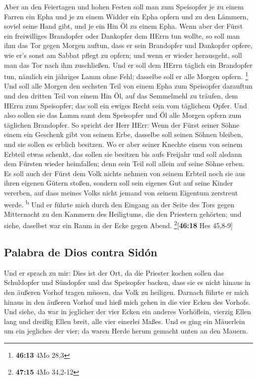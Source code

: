 Aber an den Feiertagen und hohen Festen soll man zum
Speisopfer je zu einem Farren ein Epha und je zu einem Widder ein Epha
opfern und zu den Lämmern, soviel seine Hand gibt, und je ein Hin Öl zu
einem Epha.  Wenn aber der Fürst ein freiwilliges
Brandopfer oder Dankopfer dem HErrn tun wollte, so soll man ihm das Tor
gegen Morgen auftun, dass er sein Brandopfer und Dankopfer opfere, wie
er's sonst am Sabbat pflegt zu opfern; und wenn er wieder herausgeht,
soll man das Tor nach ihm zuschließen.  Und er soll dem
HErrn täglich ein Brandopfer tun, nämlich ein jähriges Lamm ohne Fehl;
dasselbe soll er alle Morgen opfern. \footnote{\textbf{46:13} 4Mo 28,3}
 Und soll alle Morgen den sechsten Teil von einem Epha
zum Speisopfer darauftun und den dritten Teil von einem Hin Öl, auf das
Semmelmehl zu träufen, dem HErrn zum Speisopfer; das soll ein ewiges
Recht sein vom täglichem Opfer.  Und also sollen sie das
Lamm samt dem Speisopfer und Öl alle Morgen opfern zum täglichen
Brandopfer.  So spricht der Herr HErr: Wenn der Fürst
seiner Söhne einem ein Geschenk gibt von seinem Erbe, dasselbe soll
seinen Söhnen bleiben, und sie sollen es erblich besitzen.
 Wo er aber seiner Knechte einem von seinem Erbteil etwas
schenkt, das sollen sie besitzen bis aufs Freijahr und soll alsdann dem
Fürsten wieder heimfallen; denn sein Teil soll allein auf seine Söhne
erben.  Es soll auch der Fürst dem Volk nichts nehmen von
seinem Erbteil noch sie aus ihren eigenen Gütern stoßen, sondern soll
sein eigenes Gut auf seine Kinder vererben, auf dass meines Volks nicht
jemand von seinem Eigentum zerstreut werde. \textsuperscript{b}
 Und er führte mich durch den Eingang an der Seite des
Tors gegen Mitternacht zu den Kammern des Heiligtums, die den Priestern
gehörten; und siehe, daselbst war ein Raum in der Ecke gegen Abend.
\footnote{\textbf{47:15} 4Mo 34,2-12}{[}\textbf{46:18} Hes 45,8-9{]}

\hypertarget{palabra-de-dios-contra-siduxf3n}{%
\subsection{Palabra de Dios contra
Sidón}\label{palabra-de-dios-contra-siduxf3n}}

 Und er sprach zu mir: Dies ist der Ort, da die Priester
kochen sollen das Schuldopfer und Sündopfer und das Speisopfer backen,
dass sie es nicht hinaus in den äußeren Vorhof tragen müssen, das Volk
zu heiligen.  Darnach führte er mich hinaus in den
äußeren Vorhof und hieß mich gehen in die vier Ecken des Vorhofs.
 Und siehe, da war in jeglicher der vier Ecken ein
anderes Vorhöflein, vierzig Ellen lang und dreißig Ellen breit, alle
vier einerlei Maßes.  Und es ging ein Mäuerlein um ein
jegliches der vier; da waren Herde herum gemacht unten an den Mauern.

